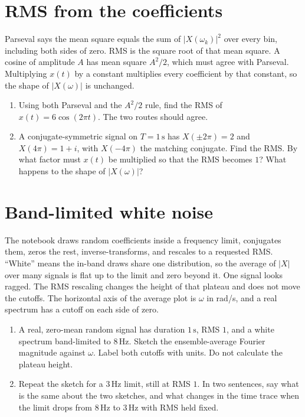 \documentclass[11pt,letterpaper]{article}
\begin{document}
\section{RMS from the coefficients}

\begin{idea}
Parseval says the mean square equals the sum of $|X(\omega_k)|^2$ over every bin, including both sides of zero. RMS is the square root of that mean square. A cosine of amplitude $A$ has mean square $A^2/2$, which must agree with Parseval. Multiplying $x(t)$ by a constant multiplies every coefficient by that constant, so the shape of $|X(\omega)|$ is unchanged.
\end{idea}

\begin{enumerate}
\item Using both Parseval and the $A^2/2$ rule, find the RMS of $x(t) = 6\cos(2\pi t)$. The two routes should agree.
\item A conjugate-symmetric signal on $T = 1\,\mathrm{s}$ has $X(\pm 2\pi) = 2$ and $X(4\pi) = 1+i$, with $X(-4\pi)$ the matching conjugate. Find the RMS. By what factor must $x(t)$ be multiplied so that the RMS becomes $1$? What happens to the shape of $|X(\omega)|$?
\end{enumerate}

\section{Band-limited white noise}

\begin{idea}
The notebook draws random coefficients inside a frequency limit, conjugates them, zeros the rest, inverse-transforms, and rescales to a requested RMS. ``White'' means the in-band draws share one distribution, so the average of $|X|$ over many signals is flat up to the limit and zero beyond it. One signal looks ragged. The RMS rescaling changes the height of that plateau and does not move the cutoffs. The horizontal axis of the average plot is $\omega$ in rad/s, and a real spectrum has a cutoff on each side of zero.
\end{idea}

\begin{enumerate}
\item A real, zero-mean random signal has duration $1\,\mathrm{s}$, RMS $1$, and a white spectrum band-limited to $8\,\mathrm{Hz}$. Sketch the ensemble-average Fourier magnitude against $\omega$. Label both cutoffs with units. Do not calculate the plateau height.
\item Repeat the sketch for a $3\,\mathrm{Hz}$ limit, still at RMS $1$. In two sentences, say what is the same about the two sketches, and what changes in the time trace when the limit drops from $8\,\mathrm{Hz}$ to $3\,\mathrm{Hz}$ with RMS held fixed.
\end{enumerate}
\end{document}
